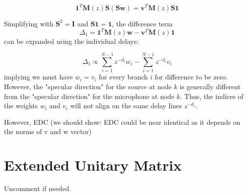 \documentclass[conference]{IEEEtran}
\begin{document}
$$ \mathbf{1}^T \mathbf{M}(z) \mathbf{S} (\mathbf{S} \mathbf{w}) = \mathbf{v}^T \mathbf{M}(z) \mathbf{S} \mathbf{1} $$

Simplifying with $\mathbf{S}^2 = \mathbf{I}$ and $\mathbf{S}\mathbf{1} = \mathbf{1}$, the difference term $$\Delta_1 = \mathbf{1}^T \mathbf{M}(z)\mathbf{w} - \mathbf{v}^T \mathbf{M}(z) \mathbf{1}$$ can be expanded using the individual delays:

$$\Delta_1 \propto \sum_{i=1}^{N-1} z^{-d_i} w_i - \sum_{i=1}^{N-1} z^{-d_i} v_i$$ implying we must have $w_i = v_i$ for every branch $i$ for difference to be zero. However, the "specular direction" for the source at node $k$ is generally different from the "specular direction" for the microphone at node $k$. Thus, the indices of the weights $w_i$ and $v_i$ will not align on the same delay lines $z^{-d_i}$.

However, EDC (we should show: EDC could be near identical as it depends on the norms of v and w vector)





\newpage
\section{Extended Unitary Matrix}
\label{sec:extended_unitary}

Uncomment if needed.
\end{document}

